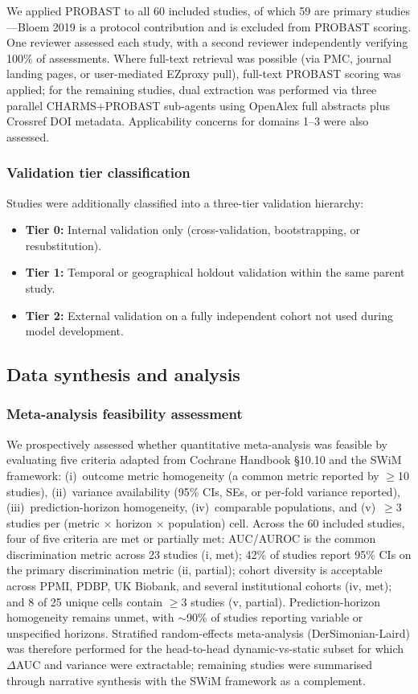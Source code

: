 We applied PROBAST to all 60 included studies, of which 59 are primary studies---Bloem 2019 is a protocol contribution and is excluded from PROBAST scoring. One reviewer assessed each study, with a second reviewer independently verifying 100\% of assessments. Where full-text retrieval was possible (via PMC, journal landing pages, or user-mediated EZproxy pull), full-text PROBAST scoring was applied; for the remaining studies, dual extraction was performed via three parallel CHARMS+PROBAST sub-agents using OpenAlex full abstracts plus Crossref DOI metadata. Applicability concerns for domains 1--3 were also assessed.

\subsubsection{Validation tier classification}

Studies were additionally classified into a three-tier validation hierarchy:
\begin{itemize}
    \item \textbf{Tier 0:} Internal validation only (cross-validation, bootstrapping, or resubstitution).
    \item \textbf{Tier 1:} Temporal or geographical holdout validation within the same parent study.
    \item \textbf{Tier 2:} External validation on a fully independent cohort not used during model development.
\end{itemize}

\subsection{Data synthesis and analysis}
\label{sr:sec:methods:synthesis}

\subsubsection{Meta-analysis feasibility assessment}
We prospectively assessed whether quantitative meta-analysis was feasible by evaluating five criteria adapted from Cochrane Handbook \S10.10 and the SWiM framework: (i)~outcome metric homogeneity (a common metric reported by $\geq$10 studies), (ii)~variance availability (95\% CIs, SEs, or per-fold variance reported), (iii)~prediction-horizon homogeneity, (iv)~comparable populations, and (v)~$\geq$3 studies per (metric $\times$ horizon $\times$ population) cell. Across the 60 included studies, four of five criteria are met or partially met: AUC/AUROC is the common discrimination metric across 23 studies (i, met); 42\% of studies report 95\% CIs on the primary discrimination metric (ii, partial); cohort diversity is acceptable across PPMI, PDBP, UK Biobank, and several institutional cohorts (iv, met); and 8 of 25 unique cells contain $\geq$3 studies (v, partial). Prediction-horizon homogeneity remains unmet, with $\sim$90\% of studies reporting variable or unspecified horizons. Stratified random-effects meta-analysis (DerSimonian-Laird) was therefore performed for the head-to-head dynamic-vs-static subset for which $\Delta$AUC and variance were extractable; remaining studies were summarised through narrative synthesis with the SWiM framework as a complement.

